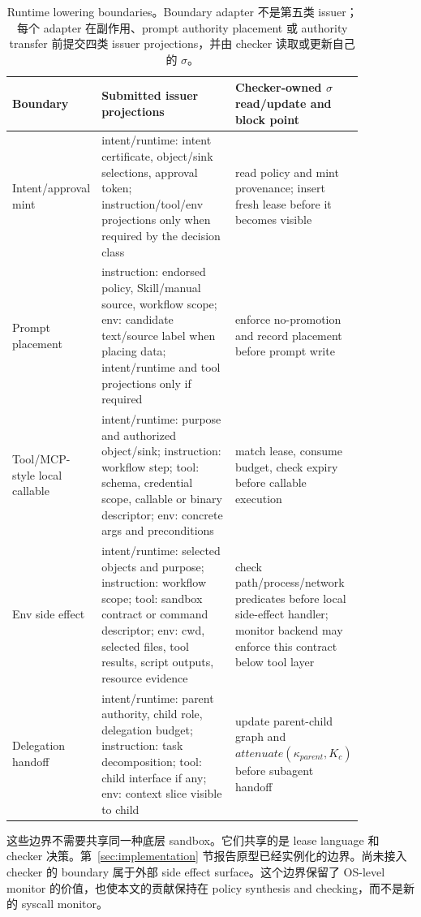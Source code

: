 \documentclass[UTF8,a4paper,11pt]{ctexart}
\begin{document}
\begin{table}[t]
\centering
\scriptsize
\setlength{\tabcolsep}{1.5pt}
\caption{Runtime lowering boundaries。Boundary adapter 不是第五类 issuer；每个 adapter 在副作用、prompt authority placement 或 authority transfer 前提交四类 issuer projections，并由 checker 读取或更新自己的 \(\sigma\)。}
\label{tab:runtime-lowering}
\begin{tabular}{p{0.16\linewidth}p{0.42\linewidth}p{0.28\linewidth}}
\toprule
Boundary & Submitted issuer projections & Checker-owned \(\sigma\) read/update and block point \\
\midrule
Intent/approval mint & intent/runtime: intent certificate, object/sink selections, approval token; instruction/tool/env projections only when required by the decision class & read policy and mint provenance; insert fresh lease before it becomes visible \\
Prompt placement & instruction: endorsed policy, Skill/manual source, workflow scope; env: candidate text/source label when placing data; intent/runtime and tool projections only if required & enforce no-promotion and record placement before prompt write \\
Tool/MCP-style local callable & intent/runtime: purpose and authorized object/sink; instruction: workflow step; tool: schema, credential scope, callable or binary descriptor; env: concrete args and preconditions & match lease, consume budget, check expiry before callable execution \\
Env side effect & intent/runtime: selected objects and purpose; instruction: workflow scope; tool: sandbox contract or command descriptor; env: cwd, selected files, tool results, script outputs, resource evidence & check path/process/network predicates before local side-effect handler; monitor backend may enforce this contract below tool layer \\
Delegation handoff & intent/runtime: parent authority, child role, delegation budget; instruction: task decomposition; tool: child interface if any; env: context slice visible to child & update parent-child graph and \(attenuate(\kappa_{parent},K_c)\) before subagent handoff \\
\bottomrule
\end{tabular}
\end{table}

这些边界不需要共享同一种底层 sandbox。它们共享的是 lease language 和 checker 决策。第~\ref{sec:implementation} 节报告原型已经实例化的边界。尚未接入 checker 的 boundary 属于外部 side effect surface。这个边界保留了 OS-level monitor 的价值，也使本文的贡献保持在 policy synthesis and checking，而不是新的 syscall monitor。
\end{document}
